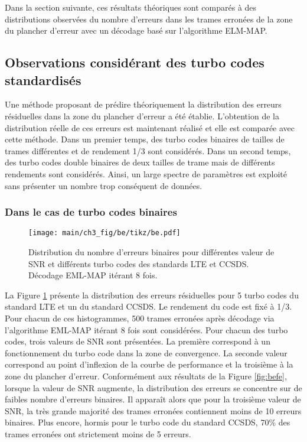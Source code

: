 Dans la section suivante, ces résultats théoriques sont comparés à des distributions observées du nombre d'erreurs dans les
trames erronées de la zone du plancher d'erreur avec un décodage basé sur l'algorithme ELM-MAP.

\subsection{Observations considérant des turbo codes standardisés}
Une méthode proposant de prédire théoriquement la distribution des erreurs résiduelles dans la zone du plancher d'erreur 
a été  établie. L'obtention 
de la distribution réelle de ces erreurs est maintenant réalisé et elle est comparée avec cette méthode. Dans un premier temps, des turbo codes binaires de tailles de 
trames différentes et de rendement 1/3 sont considérés. Dans un second temps, des turbo codes double binaires de deux
tailles de trame mais de différents rendements sont considérés. Ainsi, un large spectre de paramètres est exploité sans
présenter un nombre trop conséquent de données.

\subsubsection{Dans le cas de turbo codes binaires}
\begin{figure}[!ht]
	\centering
	\hspace*{-1cm}
	\texttt{[image: main/ch3\_fig/be/tikz/be.pdf]}
	\caption{Distribution du nombre d'erreurs binaires pour différentes valeur de SNR et différents turbo codes des 
	standards LTE et CCSDS. 
	Décodage EML-MAP itérant 8 fois. \label{fig:be}}
\end{figure}

La Figure \ref{fig:be} présente la distribution des erreurs résiduelles pour 5 turbo codes du standard LTE et un du 
standard CCSDS. Le rendement du code est fixé à 1/3. Pour chacun de ces histogrammes, 500 trames erronées
après décodage via l'algorithme EML-MAP itérant 8 fois sont considérées. 
Pour chacun des turbo codes, trois valeurs de SNR sont présentées. La première correspond à un fonctionnement du turbo code dans la zone de convergence. La seconde valeur correspond au point d'inflexion de la courbe de performance et la troisième à la
zone du plancher d'erreur. Conformément aux résultats de la Figure \ref{fig:befe}, lorsque la valeur de SNR augmente, la 
distribution des erreurs se concentre sur de faibles nombre d'erreurs binaires.
Il apparaît alors que pour la troisième valeur de SNR, la très grande majorité 
des trames erronées contiennent moins de 10 erreurs binaires. 
Plus encore, hormis pour le turbo code du standard CCSDS, 70\% des trames erronées ont strictement moins de 5 erreurs.

